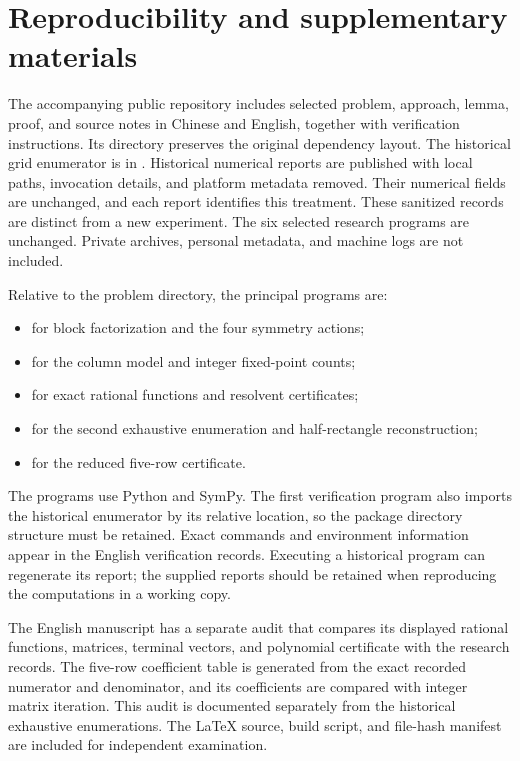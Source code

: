 \section{Reproducibility and supplementary materials}\label{app:repro}

The accompanying public repository includes selected problem,
approach, lemma, proof, and source notes in Chinese and English,
together with verification instructions.
Its 
directory preserves the original dependency layout.
The historical grid enumerator is in
.
Historical numerical reports are published with local paths,
invocation details, and platform metadata removed. Their numerical
fields are unchanged, and each report identifies this treatment.
These sanitized records are distinct from a new experiment.
The six selected research programs are unchanged. Private archives,
personal metadata, and machine logs are not included.

Relative to the problem directory, the principal programs are:
\begin{itemize}
\item {}
for block factorization and the four symmetry actions;
\item {}
for the column model and integer fixed-point counts;
\item {}
for exact rational functions and resolvent certificates;
\item {}
for the second exhaustive enumeration and half-rectangle reconstruction;
\item {}
for the reduced five-row certificate.
\end{itemize}

The programs use Python and SymPy. The first verification
program also imports the historical enumerator by its
relative location, so the package directory structure must
be retained. Exact commands and environment information
appear in the English verification records.
Executing a historical program can regenerate its report;
the supplied reports should be retained when reproducing
the computations in a working copy.

The English manuscript has a separate audit that compares
its displayed rational functions, matrices, terminal vectors,
and polynomial certificate with the research records.
The five-row coefficient table is generated from the exact
recorded numerator and denominator, and its coefficients are
compared with integer matrix iteration.
This audit is documented separately from the historical
exhaustive enumerations.
The LaTeX source, build script, and file-hash manifest are
included for independent examination.
